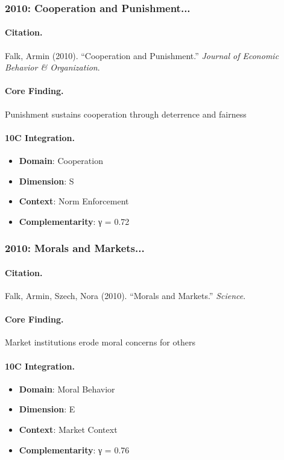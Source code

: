 \subsubsection{2010: Cooperation and Punishment...}

\paragraph{Citation.}
Falk, Armin (2010). ``Cooperation and Punishment.''
\textit{Journal of Economic Behavior & Organization}.

\paragraph{Core Finding.}
Punishment sustains cooperation through deterrence and fairness

\paragraph{10C Integration.}
\begin{itemize}[nosep]
  \item \textbf{Domain}: Cooperation
  \item \textbf{Dimension}: S
  \item \textbf{Context}: Norm Enforcement
  \item \textbf{Complementarity}: γ = 0.72
\end{itemize}


\subsubsection{2010: Morals and Markets...}

\paragraph{Citation.}
Falk, Armin, Szech, Nora (2010). ``Morals and Markets.''
\textit{Science}.

\paragraph{Core Finding.}
Market institutions erode moral concerns for others

\paragraph{10C Integration.}
\begin{itemize}[nosep]
  \item \textbf{Domain}: Moral Behavior
  \item \textbf{Dimension}: E
  \item \textbf{Context}: Market Context
  \item \textbf{Complementarity}: γ = 0.76
\end{itemize}


